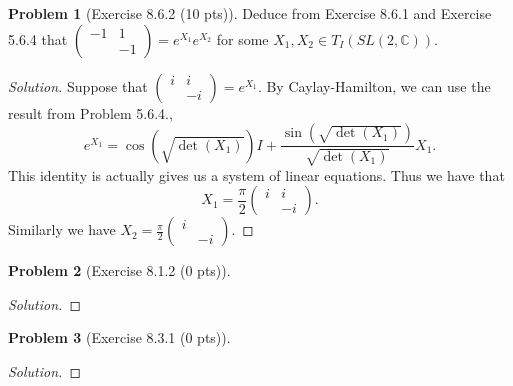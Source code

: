 \documentclass{article}
\theoremstyle{definition}
\newtheorem{problem}{Problem}
\theoremstyle{plain}
\begin{document}
\begin{problem}[Exercise 8.6.2 (10 pts)]
Deduce from Exercise 8.6.1 and Exercise 5.6.4 that $\begin{pmatrix}-1&1\\ &-1\end{pmatrix}=e^{X_1}e^{X_2}$ for some $X_1,X_2\in T_I(SL(2,\mathbb{C}))$.
\end{problem}
\begin{adjustwidth}{0.7cm}{}
\color{blue}
\begin{proof}[Solution]
Suppose that $\begin{pmatrix}i&i\\ &-i\end{pmatrix}=e^{X_1}$. By Caylay-Hamilton, we can use the result from Problem 5.6.4.,
\begin{displaymath}
e^{X_1}=\cos(\sqrt{\det(X_1)})I+\frac{\sin(\sqrt{\det(X_1)})}{\sqrt{\det(X_1)}}X_1.
\end{displaymath}
This identity is actually gives us a system of linear equations. Thus we have that
\begin{displaymath}
X_1=\frac{\pi}{2}\begin{pmatrix}i&i\\ &-i\end{pmatrix}.
\end{displaymath}
Similarly we have $X_2=\frac{\pi}{2}\begin{pmatrix}i&\\ &-i\end{pmatrix}$.
\color{black}
\end{proof}
\end{adjustwidth}

\begin{problem}[Exercise 8.1.2 (0 pts)]
\end{problem}
\begin{adjustwidth}{0.7cm}{}
\color{blue}
\begin{proof}[Solution]
\color{black}
\end{proof}
\end{adjustwidth}

\begin{problem}[Exercise 8.3.1 (0 pts)]
\end{problem}
\begin{adjustwidth}{0.7cm}{}
\color{blue}
\begin{proof}[Solution]
\color{black}
\end{proof}
\end{adjustwidth}
\end{document}
